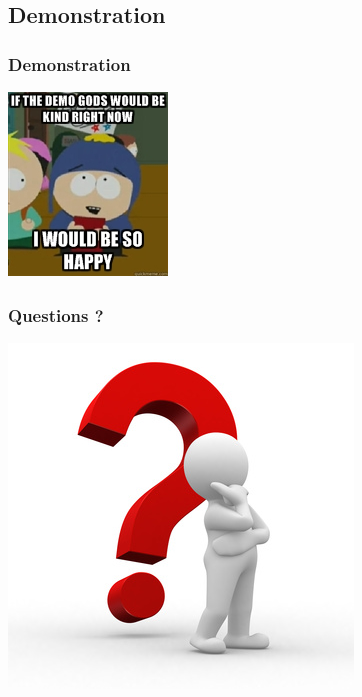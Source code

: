 \documentclass{beamer}
\begin{document}
\subsection{Demonstration}

\begin{frame}
\frametitle{Demonstration}
\begin{center}
\includegraphics[scale=1.5]{includes/demogods.jpg}
\end{center}
\end{frame}


\begin{frame}
\frametitle{Questions ?}
\begin{center}
\includegraphics[scale=0.5]{includes/questions.jpg}
\end{center}
\end{frame}
\end{document}
